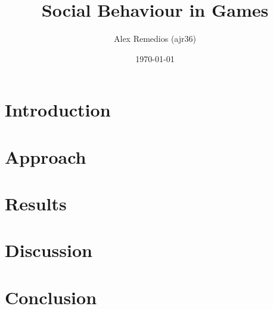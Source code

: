 \documentclass[a4paper,12pt]{article}
\title{Social Behaviour in Games}
\author{Alex Remedios (ajr36)}
\date{\today}
\begin{document}
\maketitle

\section{Introduction}


\section{Approach}


\section{Results}





\section{Discussion}




\section{Conclusion}



\appendix
\end{document}
